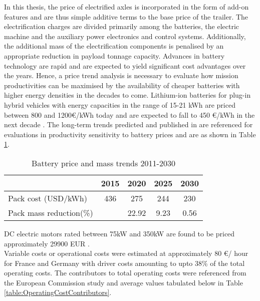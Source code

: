 \documentclass[ExampleMasters.tex]{subfiles}
\begin{document}
		In this thesis, the price of electrified axles is incorporated in the form of add-on features and are thus simple additive terms to the base price of the trailer. The electrification charges are divided primarily among the batteries, the electric machine and the auxiliary power electronics and control systems. Additionally, the additional mass of the electrification components is penalised by an appropriate reduction in payload tonnage capacity. Advances in battery technology are rapid and are expected to yield significant cost advantages over the years. Hence, a price trend analysis is necessary to evaluate how mission productivities can be maximised by the availability of cheaper batteries with higher energy densities in the decades to come. Lithium-ion batteries for plug-in hybrid vehicles with energy capacities in the range of 15-21 kWh are priced between 800 and 1200\euro /kWh today \cite{EUROBAT} and are expected to fall to 450 \euro /kWh in the next decade \cite{EUROBAT}. The long-term trends predicted and published in \cite[T.~8-16]{ElementEnergy} are referenced for evaluations in productivity sensitivity to battery prices and are as shown in Table \ref{table:batteryPriceMassTrend}.\\

		\begin{table}[ht]
			\centering 
			\begin{tabular}{l c c c c}
				\cline{2-5}
				\  & 2015 & 2020 & 2025 & 2030\\ 
				\hline
			    Pack cost (USD/kWh)  & 436 & 275 & 244 & 230\\
			    Pack mass reduction(\%)  &  & 22.92  & 9.23 & 0.56\\
				\hline 
			\end{tabular}
			\caption{Battery price and mass trends 2011-2030 \cite{ElementEnergy}} 
			\label{table:batteryPriceMassTrend} 
		\end{table}

		DC electric motors rated between 75kW and 350kW are found to be priced approximately 29900 EUR \cite{EuPLot30Motors}.\\ 

		Variable costs or operational costs were estimated at approximately 80 \euro / hour for France and Germany \cite{EuAECOM1} with driver costs amounting to upto 38\% of the total operating costs. The contributors to total operating costs were referenced from the European Commission study \cite[T.~7b]{EuAECOM2} and average values tabulated below in Table \ref{table:OperatingCostContributors}.\\
\end{document}
